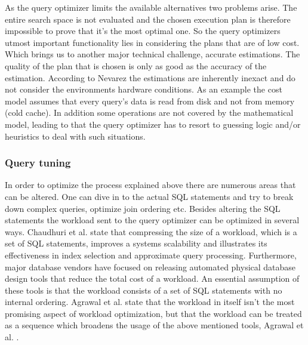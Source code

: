 \documentclass{cslthse-msc}
\begin{document}
\noindent As the query optimizer limits the available alternatives two problems arise. The entire search space is not evaluated and the chosen execution plan is therefore impossible to prove that it's the most optimal one. So the query optimizers utmost important functionality lies in considering the plans that are of low cost. Which brings us to another major technical challenge, accurate estimations. The quality of the plan that is chosen is only as good as the accuracy of the estimation. According to Nevarez    \cite{Nevarez} the estimations are inherently inexact and do not consider the environments hardware conditions. As an example the cost model assumes that every query's data is read from disk and not from memory (cold cache). In addition some operations are not covered by the mathematical model, leading to that the query optimizer has to resort to guessing logic and/or heuristics to deal with such situations. 

\subsubsection{Query tuning}
In order to optimize the process explained above there are numerous areas that can be altered. One can dive in to the actual SQL statements and try to break down complex queries, optimize join ordering etc. Besides altering the SQL statements the workload sent to the query optimizer can be optimized in several ways. Chaudhuri et al. \cite{compressing} state that compressing the size of a workload, which is a set of SQL statements, improves a systems scalability and illustrates its effectiveness in index selection and approximate query processing. Furthermore, major database vendors have focused on releasing automated physical database design tools that reduce the total cost of a workload. An essential assumption of these tools is that the workload consists of a set of SQL statements with no internal ordering. Agrawal et al. state that the workload in itself isn't the most promising aspect of workload optimization, but that the workload can be treated as a sequence which broadens the usage of the above mentioned tools, Agrawal et al. \cite{automatic}.
\end{document}
